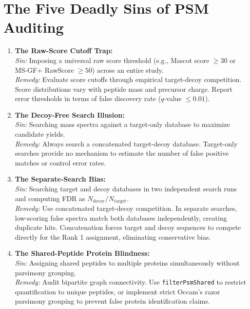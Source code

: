 \documentclass[11pt,twoside,openright]{book}
\begin{document}
\section{The Five Deadly Sins of PSM Auditing}

\begin{enumerate}
    \item \textbf{The Raw-Score Cutoff Trap:}\\
    \textit{Sin:} Imposing a universal raw score threshold (e.g., Mascot score $\ge 30$ or MS-GF+ RawScore $\ge 50$) across an entire study.\\
    \textit{Remedy:} Evaluate score cutoffs through empirical target-decoy competition. Score distributions vary with peptide mass and precursor charge. Report error thresholds in terms of false discovery rate ($q$-value $\le 0.01$).

    \item \textbf{The Decoy-Free Search Illusion:}\\
    \textit{Sin:} Searching mass spectra against a target-only database to maximize candidate yields.\\
    \textit{Remedy:} Always search a concatenated target-decoy database. Target-only searches provide no mechanism to estimate the number of false positive matches or control error rates.

    \item \textbf{The Separate-Search Bias:}\\
    \textit{Sin:} Searching target and decoy databases in two independent search runs and computing FDR as $N_{\text{decoy}} / N_{\text{target}}$.\\
    \textit{Remedy:} Use concatenated target-decoy competition. In separate searches, low-scoring false spectra match both databases independently, creating duplicate hits. Concatenation forces target and decoy sequences to compete directly for the Rank 1 assignment, eliminating conservative bias.

    \item \textbf{The Shared-Peptide Protein Blindness:}\\
    \textit{Sin:} Assigning shared peptides to multiple proteins simultaneously without parsimony grouping.\\
    \textit{Remedy:} Audit bipartite graph connectivity. Use \texttt{filterPsmShared} to restrict quantification to unique peptides, or implement strict Occam's razor parsimony grouping to prevent false protein identification claims.


\end{enumerate}
\end{document}
